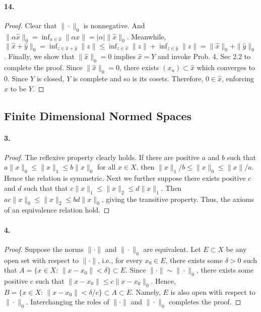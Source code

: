   \paragraph{14.}
  \begin{proof}
    Clear that $\|\cdot\|_0$ is nonnegative. And $\|\alpha\hat{x}\|_0= \inf_{x
    \in\hat{x}}\|\alpha x\| = |\alpha|\|\hat{x}\|_0$. Meanwhile, $\|\hat{x}+
    \hat{y}\|_0=\inf_{z\in\hat{x}+\hat{y}}\|z\|\le\inf_{z\in\hat{x}}\|z\|+
    \inf_{z\in\hat{y}}\|z\|=\|\hat{x}\|_0+\|\hat{y}\|_0$. Finally, we show that
    $\|\hat{x}\|_0=0$ implies $\hat{x}=Y$ and invoke Prob. 4, Sec 2.2 to 
    complete the proof. Since $\|\hat{x}\|_0=0$, there exists $(x_n)\subset
    \hat{x}$ which converges to $0$. Since $Y$ is closed, $Y$ is complete and so
    is its cosets. Therefore, $0\in\hat{x}$, enforcing $\hat{x}$ to be $Y$. 
  \end{proof}

\subsection{Finite Dimensional Normed Spaces}
  \paragraph{3.}
  \begin{proof}
    The reflexive property clearly holds. If there are positive $a$ and $b$ such 
    that $a\|x\|_0\le\|x\|_1\le b\|x\|_0$ for all $x\in X$, then $\|x\|_1/b\le
    \|x\|_0\le\|x\|/a$. Hence the relation is symmetric. Next we further suppose
    there exists positive $c$ and $d$ such that that $c\|x\|_1\le\|x\|_2\le
    d\|x\|_1$. Then $ac\|x\|_0\le \|x\|_2\le bd\|x\|_0$, giving the transitive
    property. Thus, the axioms of an equivalence relation hold.
  \end{proof}

  \paragraph{4.}
  \begin{proof}
    Suppose the norms $\|\cdot\|$ and $\|\cdot\|_0$ are equivalent. Let $E
    \subset X$ be any open set with respect to $\|\cdot\|$, i.e., for every $x_0
    \in E$, there exists some $\delta>0$ such that $A=\{x\in X:\, \|x-x_0\|<
    \delta\}\subset E$. Since $\|\cdot\|\sim\|\cdot\|_0$, there exists some 
    positive $c$ such that $\|x-x_0\|\le c\|x-x_0\|_0$. Hence, $B=\{x\in X:\,
    \|x-x_0\|<\delta/c \}\subset A\subset E$. Namely, $E$ is also open with 
    respect to $\|\cdot\|_0$. Interchanging the roles of $\|\cdot\|$ and 
    $\|\cdot\|_0$ completes the proof.
  \end{proof}
  
